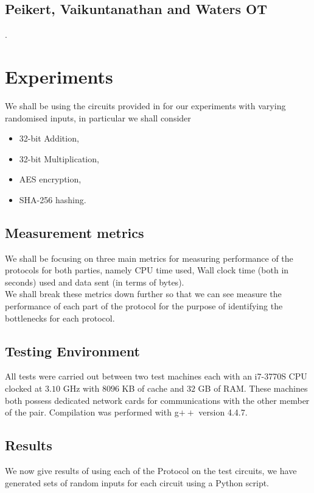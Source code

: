 \documentclass[ %
                    author={Nicholas Tutte},
                supervisor={Prof. Nigel Smart},
                    degree={MEng},
                     title={Secure Two Party Computation},
                  subtitle={A practical comparison of recent protocols},
                      type={Research - GG1K},
                      year={2015} ]{dissertation}
\begin{document}
		\section{Peikert, Vaikuntanathan and Waters OT}

			.


	\chapter{Experiments} \label{sec:Results}
		We shall be using the circuits provided in \cite{NigelCircuits} for our experiments with varying randomised inputs, in particular we shall consider
		
		\begin{itemize}
			\item 32-bit Addition,
			\item 32-bit Multiplication,
			\item AES encryption,
			\item SHA-256 hashing.
		\end{itemize}


		\section{Measurement metrics}
			We shall be focusing on three main metrics for measuring performance of the protocols for both parties, namely CPU time used, Wall clock time (both in seconds) used and data sent (in terms of bytes).\\

			We shall break these metrics down further so that we can see measure the performance of each part of the protocol for the purpose of identifying the bottlenecks for each protocol.

		\section{Testing Environment}
			All tests were carried out between two test machines each with an i7-3770S CPU clocked at $3.10$ GHz with $8096$ KB of cache and $32$ GB of RAM. These machines both possess dedicated network cards for communications with the other member of the pair. Compilation was performed with g$++$ version 4.4.7. 

		\section{Results}
			We now give results of using each of the Protocol on the test circuits, we have generated sets of random inputs for each circuit using a Python script.\\
			
\end{document}
